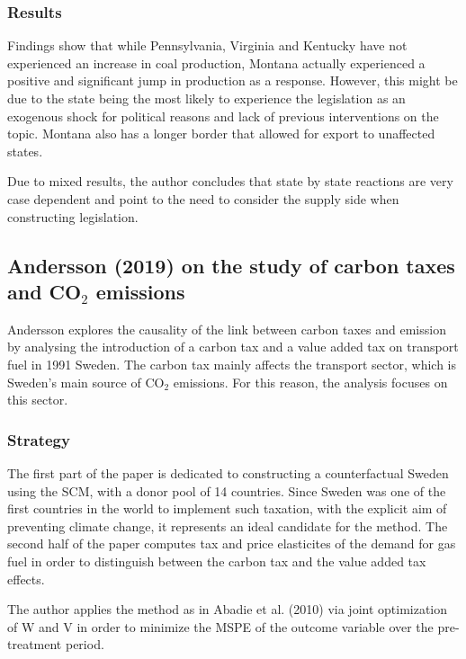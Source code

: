\documentclass[12pt,a4paper,draft]{article}
\begin{document}
\subsubsection{Results}
Findings show that while Pennsylvania, Virginia and Kentucky have not experienced an 
increase in coal production, Montana actually experienced a positive and significant 
jump in production as a response. 
However, this might be due to the state being the most likely to experience the 
legislation as an exogenous shock for political reasons and lack of previous interventions 
on the topic. Montana also has a longer border that allowed for export to unaffected 
states.
 
Due to mixed results, the author concludes that state by state reactions are very case 
dependent and point to the need to consider the supply side when constructing legislation.


\subsection{Andersson (2019) on the study of carbon taxes and CO$_2$ emissions}
Andersson explores the causality of the link between carbon taxes and emission by analysing 
the introduction of a carbon tax and a value added tax on transport fuel in 1991 Sweden. 
The carbon tax mainly affects the transport sector, which is Sweden's main source of 
CO$_2$ emissions. For this reason, the analysis focuses on this sector.

\subsubsection{Strategy}
The first part of the paper is dedicated to constructing a counterfactual Sweden using 
the SCM, with a donor pool of 14 countries.
Since Sweden was one of the first countries 
in the world to implement such taxation, with the explicit aim of preventing climate change, 
it represents an ideal candidate for the method.
The second half of the paper computes tax and price elasticites of the demand for gas fuel 
in order to distinguish between the carbon tax and the value added tax effects. 

The author applies the method as in Abadie et al. (2010) via joint optimization of W and V 
in order to minimize the MSPE of the outcome variable over the pre-treatment period.  
\end{document}
